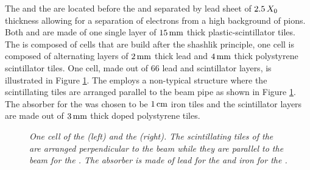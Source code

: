 The \presh and the \spd are located before the \ecal and separated by lead sheet of $2.5 \, X_0$ thickness allowing for a separation of electrons from a high background of pions. Both \presh and \spd are made of one single layer of $15\rm \,mm$ thick plastic-scintillator tiles.\\
The \ecal is composed of cells that are build after the shashlik  principle, one cell is composed of alternating layers of $2\rm \,mm$ thick lead and $4\rm \,mm$ thick polystyrene scintillator tiles. One cell, made out of 66 lead and scintillator layers, is illustrated in Figure \ref{fig:calos}.
The \hcal employs a non-typical structure where the scintillating tiles are arranged parallel to the beam pipe as shown in Figure \ref{fig:calos}. The absorber for the \hcal was chosen to be $1\rm \,cm$ iron tiles and the scintillator layers are made out of $3\rm \,mm$ thick doped polystyrene tiles.
\begin{figure}[ht]
  \vspace*{-0.5cm}
  \begin{center}
  \vspace*{-0.8cm}
  \end{center}
  \caption{\textit{One cell of the \ecal (left) and the \hcal (right). The scintillating tiles of the \ecal are arranged perpendicular to the beam while they are parallel to the beam for the \hcal. The absorber is made of lead for the \ecal and iron for the \hcal.}\cite{calo}}
  \label{fig:calos}
\end{figure}


